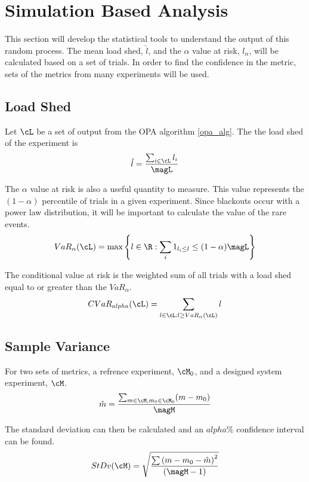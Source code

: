 
\section{Simulation Based Analysis}
	This section will develop the statistical tools to understand the output of this random process.  The mean load shed, $\hat l $, and the $\alpha$ value at risk, $l_\alpha$, will be calculated based on a set of trials.  In order to find the confidence in the metric, sets of the metrics from many experiments will be used.

\subsection{Load Shed}

	Let $\cL$ be a set of output from the OPA algorithm \ref{opa_alg}. The the load shed of the experiment is  
\begin{equation}
	\hat l = \frac{\sum_{i \in \cL} l_i }{ \magL }   
\end{equation}

	The $\alpha$ value at risk is also a useful quantity to measure.  This value represents the $(1-\alpha)$ percentile of trials in a given experiment.  Since blackouts occur with a power law distribution, it will be important to calculate the value of the rare events.
\begin{equation}
	VaR_{\alpha}(\cL) = \mbox{max} \left\{  l \in \R : \sum_i 1_{l_i \leq l } \leq ( 1 - \alpha ) \magL \right\}  
\end{equation}

	The conditional value at risk is the weighted sum of all trials with a load shed equal to or greater than the $VaR_{\alpha}$.
\begin{equation}
		CVaR_{alpha}(\cL) = \sum_{ l \in \cL : l \geq VaR_{\alpha}(\cL)} l
\end{equation}


\subsection{Sample Variance}

For two sets of metrics, a refrence experiment, $\cM_0$, and a designed system experiment, $\cM$.
\begin{equation}
	\hat m = \frac{\sum_{m \in \cM, m_0 \in \cM_0} ( m - m_0 )}{ \magM }
\end{equation}

The standard deviation can then be calculated and an $alpha \%$ confidence interval can be found.
\begin{equation}
 StDv( \cM ) = \sqrt{ \frac{\sum  \left( m - m_0 - \hat{m} \right)^2 }{  \left( \magM-1 \right)  }} 
\end{equation}


